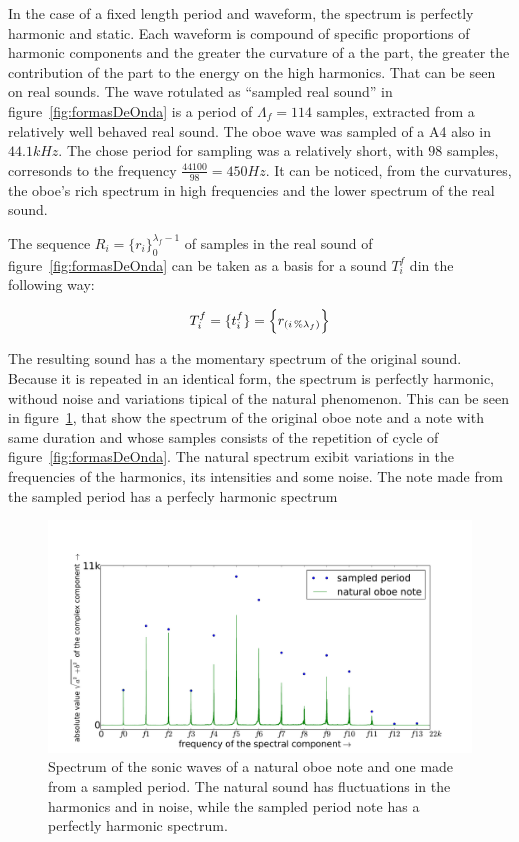 \documentclass[
 aip,
 jmp,
 amsmath,amssymb,
 reprint,
]{revtex4-1}
\begin{document}
In the case of a fixed length period and waveform, the spectrum is perfectly harmonic and static. Each waveform is compound of specific proportions of harmonic components and the greater the curvature of a the part, the greater the contribution of the part to the energy on the high harmonics. That can be seen on real sounds. The wave rotulated as ``sampled real sound'' in figure~\ref{fig:formasDeOnda} is a period of $\Lambda_f=114$ samples, extracted from a relatively well behaved real sound. The oboe wave was sampled of a A4 also in $44.1kHz$. The chose period for sampling was a relatively short, with $98$ samples, corresonds to the frequency $\frac{44100}{98}=450Hz$. It can be noticed, from the curvatures, the oboe's rich spectrum in high frequencies and the lower spectrum of the real sound.

The sequence 
$ R_i=\{ r_i \}_0^{\lambda_f-1}$ of samples in the real sound of figure~\ref{fig:formasDeOnda} can be taken as a basis for a sound $T_i^f$ din the following way: 

\begin{equation}\label{sampleandoFormaDeOnda}
     T^f_i=\{ t_i^f \}=\Bigl\{ r_{(i\,\%\lambda_{f})} \Bigr\}
\end{equation}

The resulting sound has a the momentary spectrum of the original sound. Because it is repeated in an identical form, the spectrum is perfectly harmonic, withoud noise and variations tipical of the natural phenomenon.  This can be seen in figure~\ref{fig:espectroOboe}, that show the spectrum of the original oboe note and a note with same duration and whose samples consists of the repetition of cycle of figure~\ref{fig:formasDeOnda}. The natural spectrum exibit variations in the frequencies of the harmonics, its intensities and some noise. The note made from the sampled period has a perfecly harmonic spectrum

\begin{figure}
    \centering
        \includegraphics[width=\textwidth]{figures/oboeNaturalSampledSpectrum}
    \caption{Spectrum of the sonic waves of a natural oboe note and one made from a sampled period. The natural sound has fluctuations in the harmonics and in noise, while the sampled period note has a perfectly harmonic spectrum.}
        \label{fig:espectroOboe}
\end{figure}



\nocite{*}

\end{document}

